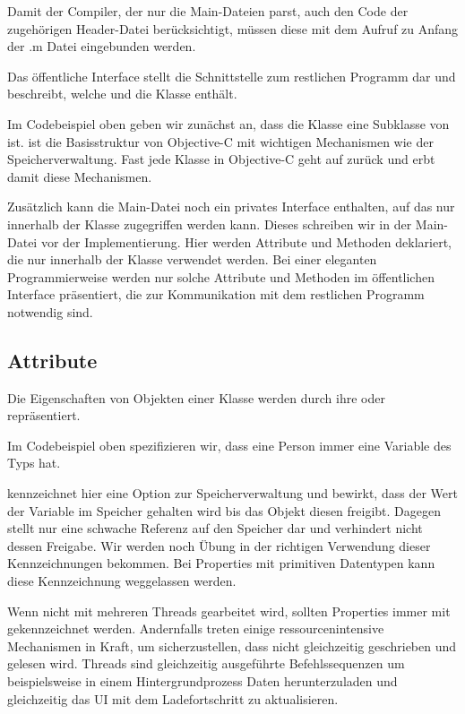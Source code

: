 \documentclass[parskip=half, final]{scrreprt}
\begin{document}
Damit der Compiler, der nur die Main-Dateien parst, auch den Code der zugehörigen Header-Datei berücksichtigt, müssen diese mit dem Aufruf  zu Anfang der .m Datei eingebunden werden.

Das öffentliche Interface stellt die Schnittstelle zum restlichen Programm dar und beschreibt, welche  und  die Klasse enthält.

Im Codebeispiel oben geben wir zunächst an, dass die Klasse  eine Subklasse von  ist.  ist die Basisstruktur von Objective-C mit wichtigen Mechanismen wie der Speicherverwaltung. Fast jede Klasse in Objective-C geht auf  zurück und erbt damit diese Mechanismen.

Zusätzlich kann die Main-Datei noch ein privates Interface enthalten, auf das nur innerhalb der Klasse zugegriffen werden kann. Dieses schreiben wir in der Main-Datei vor der Implementierung. Hier werden Attribute und Methoden deklariert, die nur innerhalb der Klasse verwendet werden. Bei einer eleganten Programmierweise werden nur solche Attribute und Methoden im öffentlichen Interface präsentiert, die zur Kommunikation mit dem restlichen Programm notwendig sind.

\subsection{Attribute}\label{sec:properties}

Die Eigenschaften von Objekten einer Klasse werden durch ihre  oder  repräsentiert.

Im Codebeispiel oben  spezifizieren wir, dass eine Person immer eine Variable  des Typs  hat.

 kennzeichnet hier eine Option zur Speicherverwaltung und bewirkt, dass der Wert der Variable im Speicher gehalten wird bis das Objekt diesen freigibt. Dagegen stellt  nur eine schwache Referenz auf den Speicher dar und verhindert nicht dessen Freigabe. Wir werden noch Übung in der richtigen Verwendung dieser Kennzeichnungen bekommen. Bei Properties mit primitiven Datentypen kann diese Kennzeichnung weggelassen werden.

Wenn nicht mit mehreren Threads gearbeitet wird, sollten Properties immer mit  gekennzeichnet werden. Andernfalls treten einige ressourcenintensive Mechanismen in Kraft, um sicherzustellen, dass nicht gleichzeitig geschrieben und gelesen wird. Threads sind gleichzeitig ausgeführte Befehlssequenzen um beispielsweise in einem Hintergrundprozess Daten herunterzuladen und gleichzeitig das UI mit dem Ladefortschritt zu aktualisieren.
\end{document}
